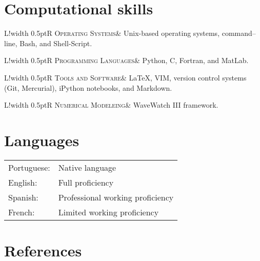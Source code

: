 \documentclass[10pt]{article}
\newcommand\VRule{\color{lightgray}\vrule width 0.5pt}
\begin{document}
\vspace{.3cm}
\section*{Computational skills}
\vspace{.3cm}
\begin{tabular}{L!{\VRule}R}
\textsc{Operating Systems}& Unix-based 
operating systems, command--line, Bash, and Shell-Script. \\
\end{tabular}
\newline \noindent 
\newline \noindent
\begin{tabular}{L!{\VRule}R}
\textsc{Programming Languages}& Python, C, Fortran, and MatLab.  \\
\end{tabular}
\newline \noindent 
\newline \noindent
\begin{tabular}{L!{\VRule}R}
\textsc{Tools and Software}& LaTeX, VIM, version control systems (Git, Mercurial), iPython notebooks, and Markdown. \\
\end{tabular}
\newline \noindent
\newline \noindent
\begin{tabular}{L!{\VRule}R}
\textsc{Numerical Modeleing}& WaveWatch III framework. \\
\end{tabular}


\vspace{.5cm}
\section*{Languages}
\vspace{.3cm}
\begin{tabular}{l l}
Portuguese: & Native language\\[3pt]
English:& Full proficiency\\[3pt] 
Spanish: & Professional working proficiency \\[3pt]
French:& Limited working proficiency \\
\end{tabular}
\vspace{.5cm}
\section*{References}
\vspace{.3cm}
\end{document}
